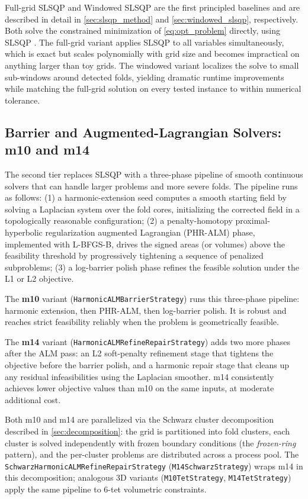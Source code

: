 Full-grid SLSQP and Windowed SLSQP are the first principled baselines and are described in detail in \autoref{sec:slsqp_method} and \autoref{sec:windowed_slsqp}, respectively. Both solve the constrained minimization of \autoref{eq:opt_problem} directly, using SLSQP \cite{Kraft_1988, SciPySLSQPDoc}. The full-grid variant applies SLSQP to all variables simultaneously, which is exact but scales polynomially with grid size and becomes impractical on anything larger than toy grids. The windowed variant localizes the solve to small sub-windows around detected folds, yielding dramatic runtime improvements while matching the full-grid solution on every tested instance to within numerical tolerance.

\subsection{Barrier and Augmented-Lagrangian Solvers: m10 and m14}
\label{sec:alm_solvers}

The second tier replaces SLSQP with a three-phase pipeline of smooth continuous solvers that can handle larger problems and more severe folds. The pipeline runs as follows: (1) a harmonic-extension seed computes a smooth starting field by solving a Laplacian system over the fold cores, initializing the corrected field in a topologically reasonable configuration; (2) a penalty-homotopy proximal-hyperbolic regularization augmented Lagrangian (PHR-ALM) phase, implemented with L-BFGS-B, drives the signed areas (or volumes) above the feasibility threshold by progressively tightening a sequence of penalized subproblems; (3) a log-barrier polish phase refines the feasible solution under the L1 or L2 objective.

The \textbf{m10} variant (\texttt{HarmonicALMBarrierStrategy}) runs this three-phase pipeline: harmonic extension, then PHR-ALM, then log-barrier polish. It is robust and reaches strict feasibility reliably when the problem is geometrically feasible.

The \textbf{m14} variant (\texttt{HarmonicALMRefineRepairStrategy}) adds two more phases after the ALM pass: an L2 soft-penalty refinement stage that tightens the objective before the barrier polish, and a harmonic repair stage that cleans up any residual infeasibilities using the Laplacian smoother. m14 consistently achieves lower objective values than m10 on the same inputs, at moderate additional cost.

Both m10 and m14 are parallelized via the Schwarz cluster decomposition described in \autoref{sec:decomposition}: the grid is partitioned into fold clusters, each cluster is solved independently with frozen boundary conditions (the \emph{frozen-ring} pattern), and the per-cluster problems are distributed across a process pool. The \texttt{SchwarzHarmonicALMRefineRepairStrategy} (\texttt{M14SchwarzStrategy}) wraps m14 in this decomposition; analogous 3D variants (\texttt{M10TetStrategy}, \texttt{M14TetStrategy}) apply the same pipeline to 6-tet volumetric constraints.


